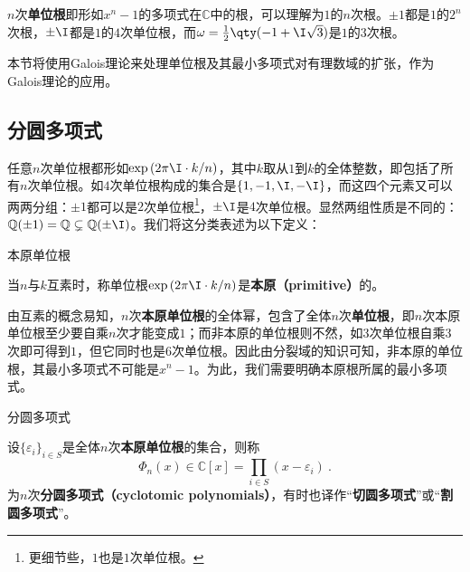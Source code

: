 




$n$次\textbf{单位根}即形如$x^n-1$的多项式在$\mathbb{C}$中的根，可以理解为$1$的$n$次根。$\pm 1$都是$1$的$2^n$次根，$\pm \I$都是$1$的$4$次单位根，而$\omega=\frac{1}{2}\qty(-1+\I\sqrt{3})$是$1$的$3$次根。

本节将使用Galois理论来处理单位根及其最小多项式对有理数域的扩张，作为Galois理论的应用。


\subsection{分圆多项式}

任意$n$次单位根都形如$\exp{(2\pi\I\cdot  k/n)}$，其中$k$取从$1$到$k$的全体整数，即包括了所有$n$次单位根。如$4$次单位根构成的集合是$\{1, -1, \I, -\I\}$，而这四个元素又可以两两分组：$\pm 1$都可以是$2$次单位根\footnote{更细节些，$1$也是$1$次单位根。}，$\pm \I$是$4$次单位根。显然两组性质是不同的：$\mathbb{Q}(\pm 1)=\mathbb{Q}\subsetneq \mathbb{Q}(\pm\I)$。我们将这分类表述为以下定义：

\begin{definition}{本原单位根}\label{def_Cycltm_2}

当$n$与$k$互素时，称单位根$\exp{(2\pi\I\cdot  k/n)}$是\textbf{本原（primitive）}的。

\end{definition}

由互素的概念易知，$n$次\textbf{本原单位根}的全体幂，包含了全体$n$次\textbf{单位根}，即$n$次本原单位根至少要自乘$n$次才能变成$1$；而非本原的单位根则不然，如$3$次单位根自乘$3$次即可得到$1$，但它同时也是$6$次单位根。因此由分裂域的知识可知，非本原的单位根，其最小多项式不可能是$x^n-1$。为此，我们需要明确本原根所属的最小多项式。

\begin{definition}{分圆多项式}\label{def_Cycltm_1}

设$\{\varepsilon_i\}_{i\in S}$是全体$n$次\textbf{本原单位根}的集合，则称
\begin{equation}
\Phi_n(x)\in \mathbb{C}[x] = \prod_{i\in S}(x-\varepsilon_i)~.
\end{equation}
为$n$次\textbf{分圆多项式（cyclotomic polynomials）}，有时也译作“\textbf{切圆多项式}”或“\textbf{割圆多项式}”。

\end{definition}

